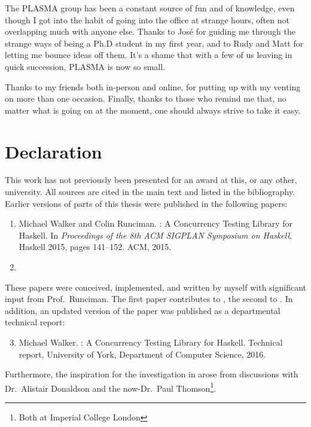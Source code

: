 The PLASMA group has been a constant source of fun and of knowledge,
even though I got into the habit of going into the office at strange
hours, often not overlapping much with anyone else.  Thanks to Jos\'e
for guiding me through the strange ways of being a Ph.D student in my
first year, and to Rudy and Matt for letting me bounce ideas off them.
It's a shame that with a few of us leaving in quick succession, PLASMA
is now so small.

Thanks to my friends both in-person and online, for putting up with my
venting on more than one occasion.  Finally, thanks to those who
remind me that, no matter what is going on at the moment, one should
always strive to take it easy.

\chapter*{Declaration}

This work has not previously been presented for an award at this, or
any other, university.  All sources are cited in the main text and
listed in the bibliography.  Earlier versions of parts of this thesis
were published in the following papers:

\begin{enumerate}
\item Michael Walker and Colin Runciman. \dejafu{}: A Concurrency
  Testing Library for Haskell.  In \emph{Proceedings of the 8th ACM
    SIGPLAN Symposium on Haskell}, Haskell 2015, pages 141--152.  ACM,
  2015.\nocite{walker2015}
\item {}
\end{enumerate}

These papers were conceived, implemented, and written by myself with
significant input from Prof.~Runciman.  The first paper contributes to
, the second to .  In addition, an
updated version of the \dejafu{} paper was published as a departmental
technical report:

\begin{enumerate}
\setcounter{enumi}{2}
\item Michael Walker. \dejafu{}: A Concurrency Testing Library for
  Haskell.  Technical report, University of York, Department of
  Computer Science, 2016.\nocite{YCS-2016-503}
\end{enumerate}

Furthermore, the inspiration for the investigation in
 arose from discussions with Dr.~Alistair
Donaldson and the now-Dr.~Paul Thomson\footnote{Both at Imperial
  College London}.
